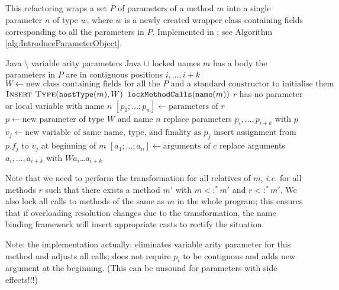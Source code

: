 \subsection{}
This refactoring wraps a set $P$ of parameters of a method $m$ into a single parameter $n$ of type $w$, where $w$ is a newly created wrapper class containing fields corresponding to all the parameters in $P$. Implemented in ; see Algorithm \ref{alg:IntroduceParameterObject}.

\begin{algorithm}[p]
\caption{$\refactoring{Introduce Parameter Object}(m : \type{Method}, P : \settp{\type{Parameter}}, w : \settp{Name}, n : \settp{Name})$}
\label{alg:IntroduceParameterObject}
\begin{algorithmic}[1]
\REQUIRE Java $\setminus$ variable arity parameters
\ENSURE Java $\cup$ locked names
\medskip
\STATE \assert $m$ has a body
\STATE \assert the parameters in $P$ are in contiguous positions $i, \ldots, i+k$
\STATE $W \leftarrow \text{new class containing fields for all the $P$ and a standard constructor to initialise them}$
\STATE $\textsc{Insert Type}(\text{\texttt{hostType}}(m), W)$
\STATE $\text{\texttt{lockMethodCalls}}(\text{\texttt{name}}(m))$
  \STATE \assert $r$ has no parameter or local variable with name $n$
  \STATE $[p_1;\ldots;p_n] \leftarrow \text{parameters of $r$}$
  \STATE $p \leftarrow \text{new parameter of type $W$ and name $n$}$
  \STATE replace parameters $p_i, \ldots, p_{i+k}$ with $p$
    \STATE $v_j \leftarrow \text{new variable of same name, type, and finality as $p_j$}$
    \STATE insert assignment from $p.f_j$ to $v_j$ at beginning of $m$
  \ENDFOR
    \STATE $[a_1;\ldots;a_n] \leftarrow \text{arguments of $c$}$
    \STATE replace arguments $a_i, \ldots, a_{i+k}$ with $W$\code{(}$a_i$\code{,}\ldots\code{,}$a_{i+k}$\code{)}
  \ENDFOR
\ENDFOR
\end{algorithmic}
\end{algorithm}

Note that we need to perform the transformation for all relatives of $m$, \emph{i.e.} for all methods $r$ such that there exists a method $m'$ with $m<:^*m'$ and $r<:^*m'$. We also lock all calls to methods of the same as $m$ in the whole program; this ensures that if overloading resolution changes due to the transformation, the name binding framework will insert appropriate casts to rectify the situation.

Note: the implementation actually: eliminates variable arity parameter for this method and adjusts all calls; does not require $p_i$ to be contiguous and adds new argument at the beginning. (This can be unsound for parameters with side effects!!!)

